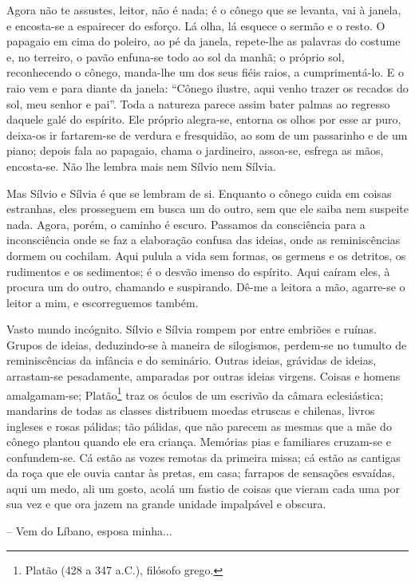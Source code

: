 Agora não te assustes, leitor, não é nada; é o cônego que se levanta,
vai à janela, e encosta-se a espairecer do esforço. Lá olha, lá esquece
o sermão e o resto. O papagaio em cima do poleiro, ao pé da janela,
repete-lhe as palavras do costume e, no terreiro, o pavão enfuna-se todo
ao sol da manhã; o próprio sol, reconhecendo o cônego, manda-lhe um dos
seus fiéis raios, a cumprimentá-lo. E o raio vem e para diante da
janela: ``Cônego ilustre, aqui venho trazer os recados do sol, meu
senhor e pai''. Toda a natureza parece assim bater palmas ao regresso
daquele galé do espírito. Ele próprio alegra-se, entorna os olhos por
esse ar puro, deixa-os ir fartarem-se de verdura e fresquidão, ao som de
um passarinho e de um piano; depois fala ao papagaio, chama o
jardineiro, assoa-se, esfrega as mãos, encosta-se. Não lhe lembra mais
nem Sílvio nem Sílvia.

Mas Sílvio e Sílvia é que se lembram de si. Enquanto o cônego cuida em
coisas estranhas, eles prosseguem em busca um do outro, sem que ele
saiba nem suspeite nada. Agora, porém, o caminho é escuro. Passamos da
consciência para a inconsciência onde se faz a elaboração confusa das
ideias, onde as reminiscências dormem ou cochilam. Aqui pulula a vida
sem formas, os germens e os detritos, os rudimentos e os sedimentos; é o
desvão imenso do espírito. Aqui caíram eles, à procura um do outro,
chamando e suspirando. Dê-me a leitora a mão, agarre-se o leitor a mim,
e escorreguemos também.

Vasto mundo incógnito. Sílvio e Sílvia rompem por entre embriões e
ruínas. Grupos de ideias, deduzindo-se à maneira de silogismos,
perdem-se no tumulto de reminiscências da infância e do seminário.
Outras ideias, grávidas de ideias, arrastam-se pesadamente, amparadas
por outras ideias virgens. Coisas e homens amalgamam-se;
Platão\footnote{Platão (428 a 347 a.C.), filósofo grego.} traz os óculos
de um escrivão da câmara eclesiástica; mandarins de todas as classes
distribuem moedas etruscas e chilenas, livros ingleses e rosas pálidas;
tão pálidas, que não parecem as mesmas que a mãe do cônego plantou
quando ele era criança. Memórias pias e familiares cruzam-se e
confundem-se. Cá estão as vozes remotas da primeira missa; cá estão as
cantigas da roça que ele ouvia cantar às pretas, em casa; farrapos de
sensações esvaídas, aqui um medo, ali um gosto, acolá um fastio de
coisas que vieram cada uma por sua vez e que ora jazem na grande unidade
impalpável e obscura.

-- Vem do Líbano, esposa minha...

